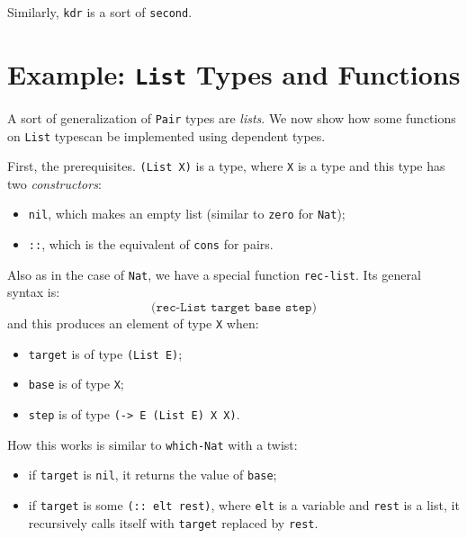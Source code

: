Similarly, \texttt{kdr} is a sort of \texttt{second}.


\section{Example: \texttt{List} Types and Functions}

A sort of generalization of \texttt{Pair} types are \emph{lists}.
We now show how some functions on \texttt{List} types\footnotemark can
be implemented using dependent types.

First, the prerequisites. \texttt{(List X)} is a type, where \texttt{X}
is a type and this type has two \emph{constructors}:
\begin{itemize}
\item \texttt{nil}, which makes an empty list (similar to \texttt{zero}
  for \texttt{Nat});
\item \texttt{::}, which is the equivalent of \texttt{cons} for pairs.
\end{itemize}

Also as in the case of \texttt{Nat}, we have a special 
function \texttt{rec-list}. Its general syntax is:
\[
  \texttt{(rec-List target base step)}
\]
and this produces an element of type \texttt{X} when:
\begin{itemize}
\item \texttt{target} is of type \texttt{(List E)};
\item \texttt{base} is of type \texttt{X};
\item \texttt{step} is of type \texttt{(-> E (List E) X X)}.
\end{itemize}

How this works is similar to \texttt{which-Nat} with a twist:
\begin{itemize}
\item if \texttt{target} is \texttt{nil}, it returns the value
  of \texttt{base};
\item if \texttt{target} is some \texttt{(:: elt rest)},
  where \texttt{elt} is a variable and \texttt{rest} is a list, it
  recursively calls itself with \texttt{target} replaced by \texttt{rest}.
\end{itemize}

